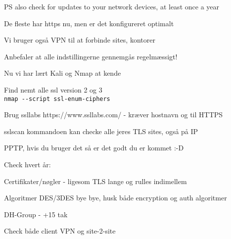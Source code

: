 \documentclass[Screen16to9,17pt]{foils}
\begin{document}
PS also check for updates to your network devices, at least once a year \smiley




\begin{list2}
\item De fleste har https nu, men er det konfigureret optimalt
\item Vi bruger også VPN til at forbinde sites, kontorer
\item Anbefaler at alle indstillingerne gennemgås regelmæssigt!
\end{list2}



\begin{list1}
\item Nu vi har lært Kali og Nmap at kende
\begin{list2}
\item Find nemt alle ssl version 2 og 3\\
\verb+nmap --script ssl-enum-ciphers+
\item Brug ssllabs https://www.ssllabs.com/ - kræver hostnavn og til HTTPS
\item sslscan kommandoen kan checke alle jeres TLS sites, også på IP
\end{list2}
\end{list1}



\begin{list1}
\item PPTP, hvis du bruger det så er det godt du er kommet :-D
\item Check hvert år:
\begin{list2}
\item Certifikater/nøgler - ligesom TLS lange og rulles indimellem
\item Algoritmer DES/3DES bye bye, husk både encryption og auth algoritmer
\item DH-Group - +15 tak
\item Check både client VPN og site-2-site
\end{list2}
\end{list1}

\end{document}
